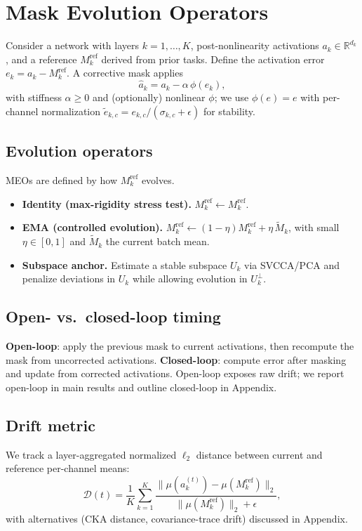 \documentclass[11pt]{article}
\begin{document}
\section{Mask Evolution Operators}
Consider a network with layers $k=1,\dots,K$, post-nonlinearity activations $a_k\in\mathbb{R}^{d_k}$, and a reference $M_k^{\text{ref}}$ derived from prior tasks. Define the activation error $e_k=a_k-M_k^{\text{ref}}$. A corrective mask applies
\begin{equation}
\hat a_k = a_k - \alpha\,\phi(e_k),
\label{eq:correction}
\end{equation}
with stiffness $\alpha\ge 0$ and (optionally) nonlinear $\phi$; we use $\phi(e)=e$ with per-channel normalization $\tilde e_{k,c}=e_{k,c}/(\sigma_{k,c}+\epsilon)$ for stability.

\subsection{Evolution operators}
MEOs are defined by how $M_k^{\text{ref}}$ evolves.
\begin{itemize}[leftmargin=1.3em]
\item \textbf{Identity (max-rigidity stress test).} $M_k^{\text{ref}}\leftarrow M_k^{\text{ref}}$.
\item \textbf{EMA (controlled evolution).} $M_k^{\text{ref}}\leftarrow (1-\eta)M_k^{\text{ref}}+\eta\,\tilde M_k$, with small $\eta\in[0,1]$ and $\tilde M_k$ the current batch mean.
\item \textbf{Subspace anchor.} Estimate a stable subspace $U_k$ via SVCCA/PCA and penalize deviations in $U_k$ while allowing evolution in $U_k^\perp$.
\end{itemize}

\subsection{Open- vs.\ closed-loop timing}
\label{sec:timing}
\textbf{Open-loop}: apply the previous mask to current activations, then recompute the mask from uncorrected activations. \textbf{Closed-loop}: compute error after masking and update from corrected activations. Open-loop exposes raw drift; we report open-loop in main results and outline closed-loop in Appendix.

\subsection{Drift metric}
We track a layer-aggregated normalized $\ell_2$ distance between current and reference per-channel means:
\begin{equation}
\mathcal{D}(t)=\frac{1}{K}\sum_{k=1}^{K}\frac{\|\mu(a_k^{(t)})-\mu(M_k^{\text{ref}})\|_2}{\|\mu(M_k^{\text{ref}})\|_2+\epsilon},
\end{equation}
with alternatives (CKA distance, covariance-trace drift) discussed in Appendix.
\end{document}
